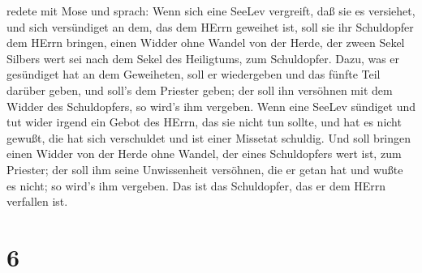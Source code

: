 redete mit Mose und sprach:  Wenn sich eine SeeLev
vergreift, daß sie es versiehet, und sich versündiget an dem, das dem
HErrn geweihet ist, soll sie ihr Schuldopfer dem HErrn bringen, einen
Widder ohne Wandel von der Herde, der zween Sekel Silbers wert sei nach
dem Sekel des Heiligtums, zum Schuldopfer.  Dazu, was er
gesündiget hat an dem Geweiheten, soll er wiedergeben und das fünfte
Teil darüber geben, und soll's dem Priester geben; der soll ihn
versöhnen mit dem Widder des Schuldopfers, so wird's ihm vergeben.
 Wenn eine SeeLev sündiget und tut wider irgend ein Gebot
des HErrn, das sie nicht tun sollte, und hat es nicht gewußt, die hat
sich verschuldet und ist einer Missetat schuldig.  Und soll
bringen einen Widder von der Herde ohne Wandel, der eines Schuldopfers
wert ist, zum Priester; der soll ihm seine Unwissenheit versöhnen, die
er getan hat und wußte es nicht; so wird's ihm vergeben. 
Das ist das Schuldopfer, das er dem HErrn verfallen ist.

\hypertarget{section-5}{%
\section{6}\label{section-5}}

